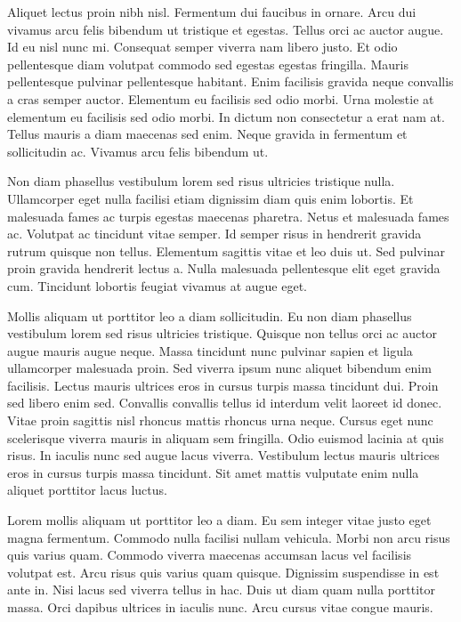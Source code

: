 \documentclass[11pt,a4paper]{article}
\begin{document}
Aliquet lectus proin nibh nisl. Fermentum dui faucibus in ornare. Arcu dui vivamus arcu felis bibendum ut tristique et egestas. Tellus orci ac auctor augue. Id eu nisl nunc mi. Consequat semper viverra nam libero justo. Et odio pellentesque diam volutpat commodo sed egestas egestas fringilla. Mauris pellentesque pulvinar pellentesque habitant. Enim facilisis gravida neque convallis a cras semper auctor. Elementum eu facilisis sed odio morbi. Urna molestie at elementum eu facilisis sed odio morbi. In dictum non consectetur a erat nam at. Tellus mauris a diam maecenas sed enim. Neque gravida in fermentum et sollicitudin ac. Vivamus arcu felis bibendum ut.

Non diam phasellus vestibulum lorem sed risus ultricies tristique nulla. Ullamcorper eget nulla facilisi etiam dignissim diam quis enim lobortis. Et malesuada fames ac turpis egestas maecenas pharetra. Netus et malesuada fames ac. Volutpat ac tincidunt vitae semper. Id semper risus in hendrerit gravida rutrum quisque non tellus. Elementum sagittis vitae et leo duis ut. Sed pulvinar proin gravida hendrerit lectus a. Nulla malesuada pellentesque elit eget gravida cum. Tincidunt lobortis feugiat vivamus at augue eget.

Mollis aliquam ut porttitor leo a diam sollicitudin. Eu non diam phasellus vestibulum lorem sed risus ultricies tristique. Quisque non tellus orci ac auctor augue mauris augue neque. Massa tincidunt nunc pulvinar sapien et ligula ullamcorper malesuada proin. Sed viverra ipsum nunc aliquet bibendum enim facilisis. Lectus mauris ultrices eros in cursus turpis massa tincidunt dui. Proin sed libero enim sed. Convallis convallis tellus id interdum velit laoreet id donec. Vitae proin sagittis nisl rhoncus mattis rhoncus urna neque. Cursus eget nunc scelerisque viverra mauris in aliquam sem fringilla. Odio euismod lacinia at quis risus. In iaculis nunc sed augue lacus viverra. Vestibulum lectus mauris ultrices eros in cursus turpis massa tincidunt. Sit amet mattis vulputate enim nulla aliquet porttitor lacus luctus.

Lorem mollis aliquam ut porttitor leo a diam. Eu sem integer vitae justo eget magna fermentum. Commodo nulla facilisi nullam vehicula. Morbi non arcu risus quis varius quam. Commodo viverra maecenas accumsan lacus vel facilisis volutpat est. Arcu risus quis varius quam quisque. Dignissim suspendisse in est ante in. Nisi lacus sed viverra tellus in hac. Duis ut diam quam nulla porttitor massa. Orci dapibus ultrices in iaculis nunc. Arcu cursus vitae congue mauris.
\end{document}
